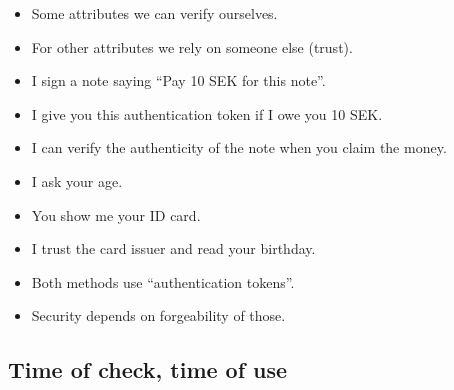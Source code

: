 \begin{frame}
  \begin{itemize}
    \item Some attributes we can verify ourselves.
    \item For other attributes we rely on someone else (\ie trust).
  \end{itemize}
\end{frame}

\begin{frame}
  \begin{example}
    \begin{itemize}
      \item I sign a note saying \enquote{Pay 10 SEK for this note}.
      \item I give you this authentication token if I owe you 10 SEK.
      \item I can verify the authenticity of the note when you claim the money.
    \end{itemize}
  \end{example}

  \pause

  \begin{example}
    \begin{itemize}
      \item I ask your age.
      \item You show me your ID card.
      \item I trust the card issuer and read your birthday.
    \end{itemize}
  \end{example}
\end{frame}

\begin{frame}
  \begin{remark}
    \begin{itemize}
      \item Both methods use \enquote{authentication tokens}.
      \item Security depends on forgeability of those.
    \end{itemize}
  \end{remark}
\end{frame}

\subsection{Time of check, time of use}

